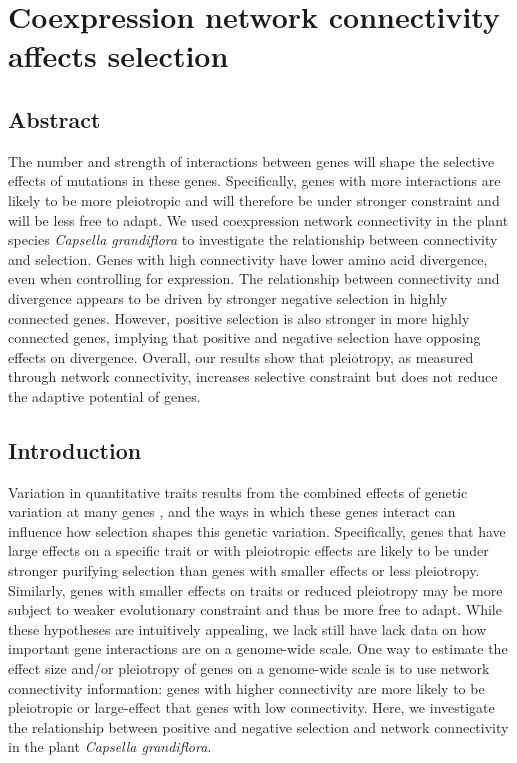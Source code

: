 \setlength{\parindent}{0ex}
\setlength{\parskip}{2ex}

\chapter{Coexpression network connectivity affects selection}

\section{Abstract}
The number and strength of interactions between genes will shape the selective effects of mutations in these genes. Specifically, genes with more interactions are likely to be more pleiotropic and will therefore be under stronger constraint and will be less free to adapt. We used coexpression network connectivity in the plant species \textit{Capsella grandiflora} to investigate the relationship between connectivity and selection. Genes with high connectivity have lower amino acid divergence, even when controlling for expression. The relationship between connectivity and divergence appears to be driven by stronger negative selection in highly connected genes. However, positive selection is also stronger in more highly connected genes, implying that positive and negative selection have opposing effects on divergence. Overall, our results show that pleiotropy, as measured through network connectivity, increases selective constraint but does not reduce the adaptive potential of genes.

\section{Introduction}

Variation in quantitative traits results from the combined effects of genetic variation at many genes \citep{lynch1998}, and the ways in which these genes interact can influence how selection shapes this genetic variation. Specifically, genes that have large effects on a specific trait or with pleiotropic effects are likely to be under stronger purifying selection than genes with smaller effects or less pleiotropy\citep{orr2000, stern2008}. Similarly, genes with smaller effects on traits or reduced pleiotropy may be more subject to weaker evolutionary constraint and thus be more free to adapt\citep{orr2000, stern2008}. While these hypotheses are intuitively appealing, we lack still have lack data on how important gene interactions are on a genome-wide scale. One way to estimate the effect size and/or pleiotropy of genes on a genome-wide scale is to use network connectivity information: genes with higher connectivity are more likely to be pleiotropic or large-effect that genes with low connectivity\citep{he2006}. Here, we investigate the relationship between positive and negative selection and network connectivity in the plant \textit{Capsella grandiflora}.

